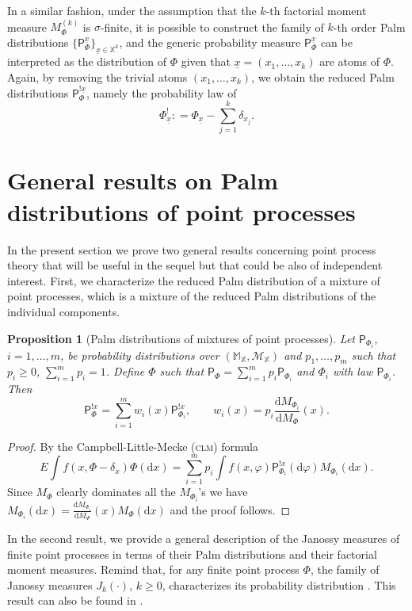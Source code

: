\documentclass[11pt,a4paper,oneside]{article}
\newcommand{\dd}{\mathrm d}
\newcommand{\plaw}{\mathsf{P}}
\newcommand{\E}{E}
\newcommand{\X}{\mathbb{X}}
\newtheorem{proposition}{Proposition}
\theoremstyle{definition}
\theoremstyle{remark}
\begin{document}
In a similar fashion, under the assumption that the $k$-th factorial moment measure $M_\Phi^{(k)}$ is $\sigma$-finite, it is possible to construct the family of  $k$-th order Palm distributions $\{\plaw_{\Phi}^{\underline{x}}\}_{\underline{x} \in \X^k}$, and the generic probability measure $\plaw_{\Phi}^{\underline{x}}$ can be interpreted as the distribution of $\Phi$ given that $\underline{x} = (x_1, \ldots, x_k)$ are atoms of $\Phi$. 
Again, by removing the trivial atoms $(x_1, \ldots , x_k)$, we obtain the reduced Palm distributions $\plaw_{\Phi}^{!\underline{x}}$, namely the probability law of
\[
\Phi^!_{\underline{x}} : = \Phi_{\underline{x}} -\sum_{j =1}^k \delta_{x_j}.
\]


\section{General results on Palm distributions of point processes}

In the present section we prove two general results concerning point process theory that will be useful in the sequel but that could be also of independent interest.
First, we characterize the reduced Palm distribution of a mixture of point processes, which is a mixture of the reduced Palm distributions of the individual components. 
\begin{proposition}[Palm distributions of mixtures of point processes]\label{prp:palm_mixture}
    Let $\plaw_{\Phi_i}$, $i=1, \ldots, m$, be probability distributions over $(\mathbb M_{\X}, \mathcal{M}_{\X})$ and $p_1, \ldots, p_m$ such that $p_i \geq 0$, $\sum_{i=1}^m p_i = 1$. Define $\Phi$ such that $\plaw_{\Phi} = \sum_{i=1}^m p_i \plaw_{\Phi_i}$ and $\Phi_i$ with law $\plaw_{\Phi_i}$. 
    Then
    \[
        \plaw^{!x}_{\Phi} = \sum_{i=1}^m w_i(x) \plaw^{!x}_{\Phi_i}, \qquad w_i(x) = p_i \frac{\dd M_{\Phi_i}}{\dd M_{\Phi}}(x) .
    \]
\end{proposition}
\begin{proof}
    By the Campbell-Little-Mecke (\textsc{clm}) formula
    \[
         \E \int f(x, \Phi - \delta_{x}) \Phi(\dd x)
=\sum_{i=1}^m p_i \int f(x,\varphi) \plaw^{!x}_{\Phi_i}(\dd\varphi) M_{\Phi_i}(\dd x).
    \]
    Since $M_{\Phi}$ clearly dominates all the $M_{\Phi_i}$'s we have $M_{\Phi_i}(\dd x) = \frac{\dd M_{\Phi_i}}{\dd M_{\Phi}}(x) M_{\Phi}(\dd x)$ and the proof follows.
\end{proof}



In the second result, we provide a general description of the Janossy measures of finite point processes in terms of their Palm distributions and their factorial moment measures. Remind that, for any finite point process $\Phi$, the family of Janossy measures $J_k(\cdot)$, $k\geq 0$, characterizes its probability distribution \citep[Proposition 5.3.II,][]{DaVeJo1}. This result can also be found in \cite{coeurjolly2017tutorial}.
\end{document}
